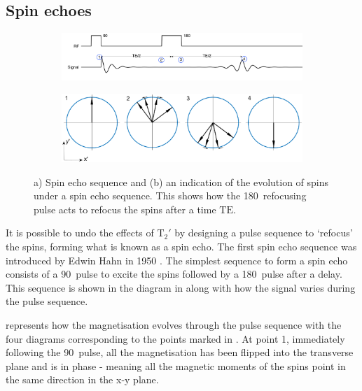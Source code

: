 \subsection{Spin echoes}
\label{sec:spin_echoes}
\begin{figure}
	\centering
	\begin{subfigure}{0.9\textwidth}
		\includegraphics[width = \textwidth]{figures/background/spinecho.png}
		\caption{}
		\label{fig:spinechosequence}
	\end{subfigure}
	
	\begin{subfigure}{0.9\textwidth}
		\includegraphics[width = \textwidth]{figures/background/spinecho_evolution.eps}
		\caption{}
		\label{fig:spinecho_evolution}
	\end{subfigure}

	\caption[The spin echo sequence and the evolution of spin under a spin echo sequence.]{a) Spin echo sequence and (b) an indication of the evolution of spins under a spin echo sequence. This shows how the 180\degree\ refocusing pulse acts to refocus the spins after a time $\mathrm{TE}$.}
	\label{fig:spinecho}
\end{figure}
It is possible to undo the effects of $\mathrm{T}_2'$ by designing a pulse sequence to `refocus' the spins, forming what is known as a spin echo.
The first spin echo sequence was introduced by Edwin Hahn in 1950 \cite{Hahn1950}. The simplest sequence to form a spin echo consists of a 90\degree\ pulse to excite the spins followed by a 180\degree\ pulse after a delay. 
This sequence is shown in the diagram in  along with how the signal varies during the pulse sequence.
 
 represents how the magnetisation evolves through the pulse sequence with the four diagrams corresponding to the points marked in . 
At point 1, immediately following the 90\degree\ pulse, all the magnetisation has been flipped into the transverse plane and is in phase - meaning all the magnetic moments of the spins point in the same direction in the x-y plane. 

